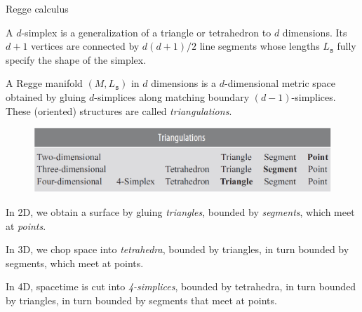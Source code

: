 \documentclass[12pt,titlepage]{article}
\begin{document}
\begin{frame}{Regge calculus}
    \begin{list}{\,}{\leftmargin=1em \itemindent=0em}
        \item A $d$-simplex is a generalization of a triangle or tetrahedron to $d$ dimensions. Its $d+1$ vertices are connected by $d(d+1)/2$ line segments whose lengths $L_\mathtt{s}$ fully specify the shape of the simplex.
        \item A Regge manifold $(M,L_\mathtt{s})$ in $d$ dimensions is a $d$-dimensional metric space obtained by gluing $d$-simplices along matching boundary $(d-1)$-simplices. These (oriented) structures are called \textit{triangulations}.\\\noindent\FloatBarrier
        \begin{figure}[!ht]
            \begin{minipage}{\linewidth}
                \centering\includegraphics[width=0.8\linewidth]{4.2}
            \end{minipage}
        \end{figure}\FloatBarrier
        \item In 2D, we obtain a surface by gluing \textit{triangles}, bounded by \textit{segments}, which meet at \textit{points}.
        \item In 3D, we chop space into \textit{tetrahedra}, bounded by triangles, in turn bounded by segments, which meet at points.
        \item In 4D, spacetime is cut into \textit{4-simplices}, bounded by tetrahedra, in turn bounded by triangles, in turn bounded by segments that meet at points.
    \end{list}
\end{frame}
\end{document}
